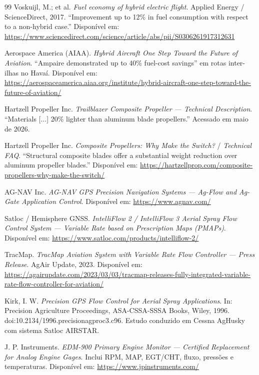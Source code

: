 \documentclass[a4paper,12pt]{article}
\begin{document}
\begin{thebibliography}{99}
    Voskuijl, M.; et al. \textit{Fuel economy of hybrid electric flight}. Applied Energy / ScienceDirect, 2017. ``Improvement up to 12\% in fuel consumption with respect to a non-hybrid case.'' Disponível em: \url{https://www.sciencedirect.com/science/article/abs/pii/S0306261917312631}

    Aerospace America (AIAA). \textit{Hybrid Aircraft One Step Toward the Future of Aviation}. ``Ampaire demonstrated up to 40\% fuel-cost savings'' em rotas inter-ilhas no Havaí. Disponível em: \url{https://aerospaceamerica.aiaa.org/institute/hybrid-aircraft-one-step-toward-the-future-of-aviation/}

    Hartzell Propeller Inc. \textit{Trailblazer Composite Propeller --- Technical Description}. ``Materials [...] 20\% lighter than aluminum blade propellers.'' Acessado em maio de 2026.

    Hartzell Propeller Inc. \textit{Composite Propellers: Why Make the Switch?} / \textit{Technical FAQ}. ``Structural composite blades offer a substantial weight reduction over aluminum propeller blades.'' Disponível em: \url{https://hartzellprop.com/composite-propellers-why-make-the-switch/}

    AG-NAV Inc. \textit{AG-NAV GPS Precision Navigation Systems --- Ag-Flow and Ag-Gate Application Control}. Disponível em: \url{https://www.agnav.com/}

    Satloc / Hemisphere GNSS. \textit{IntelliFlow 2 / IntelliFlow 3 Aerial Spray Flow Control System --- Variable Rate based on Prescription Maps (PMAPs)}. Disponível em: \url{https://www.satloc.com/products/intelliflow-2/}

    TracMap. \textit{TracMap Aviation System with Variable Rate Flow Controller --- Press Release}. AgAir Update, 2023. Disponível em: \url{https://agairupdate.com/2023/03/03/tracmap-releases-fully-integrated-variable-rate-flow-controller-for-aviation/}

    Kirk, I. W. \textit{Precision GPS Flow Control for Aerial Spray Applications}. In: Precision Agriculture Proceedings, ASA-CSSA-SSSA Books, Wiley, 1996. doi:10.2134/1996.precisionagproc3.c96. Estudo conduzido em Cessna AgHusky com sistema Satloc AIRSTAR.

    J. P. Instruments. \textit{EDM-900 Primary Engine Monitor --- Certified Replacement for Analog Engine Gages}. Inclui RPM, MAP, EGT/CHT, fluxo, pressões e temperaturas. Disponível em: \url{https://www.jpinstruments.com/}


\end{thebibliography}
\end{document}
